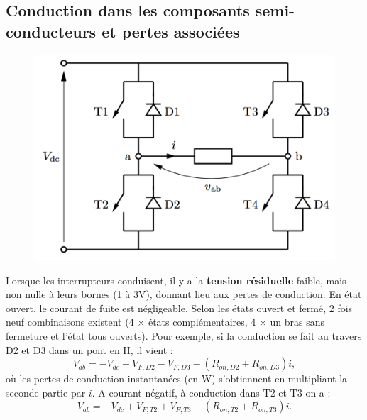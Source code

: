	\subsection{Conduction dans les composants semi-conducteurs et pertes associées}
		\begin{figure}
		\vspace{-5mm}
		\includegraphics[scale=0.3]{ch4/9}
		\end{figure}
		Lorsque les interrupteurs conduisent, il y a la \textbf{tension résiduelle} faible, mais non nulle à leurs bornes (1 à 3V), donnant lieu aux pertes de conduction. En état ouvert, le courant de fuite est négligeable. Selon les états ouvert et fermé, 2 fois neuf combinaisons existent (4 $\times$ états complémentaires, 4 $\times$ un bras sans fermeture et l'état tous ouverts). Pour exemple, si la conduction se fait au travers D2 et D3 dans un pont en H, il vient :
		\begin{equation}
			V_{ab} = -V_{dc}-V_{F,D2}-V_{F,D3}-(R_{on,D2}+R_{on,D3})i,
		\end{equation}
		où les pertes de conduction instantanées (en W) s'obtiennent en multipliant la seconde partie par $i$. A courant négatif, à conduction dans T2 et T3 on a :
		\begin{equation}
			V_{ab} = -V_{dc}+V_{F,T2}+V_{F,T3}-(R_{on,T2}+R_{on,T3})i. 
		\end{equation}
		

